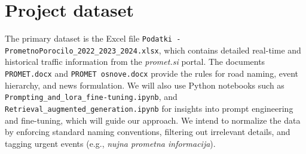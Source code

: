 \documentclass[fleqn,moreauthors,10pt]{ds_report}
\begin{document}
\section{Project dataset}
The primary dataset is the Excel file \newline \texttt{Podatki - PrometnoPorocilo\_2022\_2023\_2024.xlsx}, which contains detailed real-time and historical traffic information from the \textit{promet.si} portal. The documents \texttt{PROMET.docx} and \texttt{PROMET osnove.docx} provide the rules for road naming, event hierarchy, and news formulation. We will also use Python notebooks such as \newline \texttt{Prompting\_and\_lora\_fine-tuning.ipynb}, and  \newline \texttt{Retrieval\_augmented\_generation.ipynb} for insights into prompt engineering and fine-tuning, which will guide our approach. We intend to normalize the data by enforcing standard naming conventions, filtering out irrelevant details, and tagging urgent events (e.g., \textit{nujna prometna informacija}).




\end{document}
